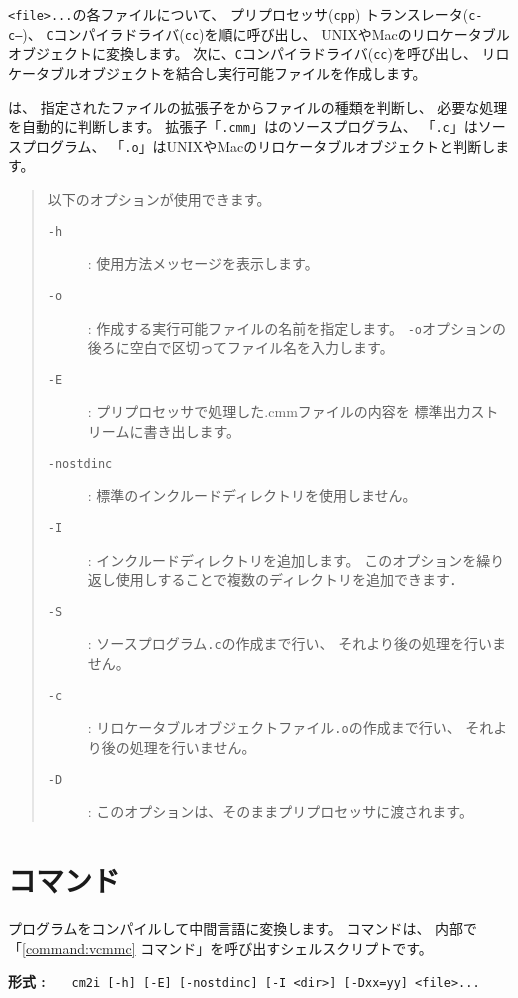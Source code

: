 {\tt <file>...}の各ファイルについて、
プリプロセッサ({\tt cpp})
トランスレータ({\tt c-c--})、
{\tt C}コンパイラドライバ({\tt cc})を順に呼び出し、
UNIXやMacのリロケータブルオブジェクトに変換します。
次に、{\tt C}コンパイラドライバ({\tt cc})を呼び出し、
リロケータブルオブジェクトを結合し実行可能ファイルを作成します。

{\cmc}は、
指定されたファイルの拡張子をからファイルの種類を判断し、
必要な処理を自動的に判断します。
拡張子「{\tt .cmm}」は{\cmml}のソースプログラム、
「{\tt .c}」は{\cl}ソースプログラム、
「{\tt .o}」はUNIXやMacのリロケータブルオブジェクトと判断します。

\begin{quote}
\hspace{-1em}以下のオプションが使用できます。

\begin{description}
\item[{\tt -h}] : 使用方法メッセージを表示します。
\item[{\tt -o}] : 作成する実行可能ファイルの名前を指定します。
{\tt -o}オプションの後ろに空白で区切ってファイル名を入力します。
\item[{\tt -E}] : プリプロセッサで処理した{.cmm}ファイルの内容を
標準出力ストリームに書き出します。
\item[{\tt -nostdinc}] : 標準のインクルードディレクトリを使用しません。
\item[{\tt -I}] : インクルードディレクトリを追加します。
このオプションを繰り返し使用しすることで複数のディレクトリを追加できます．
\item[{\tt -S}] : {\cl}ソースプログラム{\tt .c}の作成まで行い、
それより後の処理を行いません。
\item[{\tt -c}] : リロケータブルオブジェクトファイル{\tt .o}の作成まで行い、
それより後の処理を行いません。
\item[{\tt -D}] : このオプションは、そのままプリプロセッサに渡されます。
\end{description}
\end{quote}

\section{{\cmi}コマンド}

{\cmm}プログラムをコンパイルして中間言語に変換します。
{\cmi}コマンドは、
内部で「\ref{command:vcmmc} {\icmmc}コマンド」を呼び出すシェルスクリプトです。

\begin{flushleft}
{\bf 形式 : }~~~\verb/cm2i [-h] [-E] [-nostdinc] [-I <dir>] [-Dxx=yy] <file>.../
\end{flushleft}

